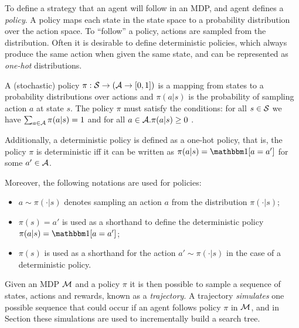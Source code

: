     To define a strategy that an agent will follow in an MDP, and agent defines a \textit{policy}. A policy maps each state in the state space to a probability distribution over the action space. To ``follow'' a policy, actions are sampled from the distribution. Often it is desirable to define deterministic policies, which always produce the same action when given the same state, and can be represented as \textit{one-hot} distributions. 

    \begin{defn}
        \label{def:policy}
        A \textnormal{(stochastic) policy} $\pi:\mathcal{S}\rightarrow (\mathcal{A} \rightarrow [0,1])$ is a mapping from states to a probability distributions over actions and $\pi(a|s)$ is the probability of sampling action $a$ at state $s$. The policy $\pi$ must satisfy the conditions: for all $s \in \mathcal{S}$ we have $\sum_{a\in\mathcal{A}} \pi(a|s) = 1$ and for all $a\in\mathcal{A}. \pi(a|s)\geq 0$ . 
        
        Additionally, a \textnormal{deterministic policy} is defined as a one-hot policy, that is, the policy $\pi$ is deterministic iff it can be written as $\pi(a|s)=\one[a=a']$ for some $a'\in\mathcal{A}$.

        Moreover, the following notations are used for policies:
        \begin{itemize}
            \item $a\sim\pi(\cdot|s)$ denotes sampling an action $a$ from the distribution $\pi(\cdot|s)$;
            \item $\pi(s)=a'$ is used as a shorthand to define the deterministic policy $\pi(a|s)=\one[a=a']$; 
            \item $\pi(s)$ is used as a shorthand for the action $a'\sim\pi(\cdot|s)$ in the case of a deterministic policy.
        \end{itemize}
    \end{defn}
    
    Given an MDP $\mathcal{M}$ and a policy $\pi$ it is then possible to sample a sequence of states, actions and rewards, known as a \textit{trajectory}. A trajectory \textit{simulates} one possible sequence that could occur if an agent follows policy $\pi$ in $\mathcal{M}$, and in Section  these simulations are used to incrementally build a search tree.
    
